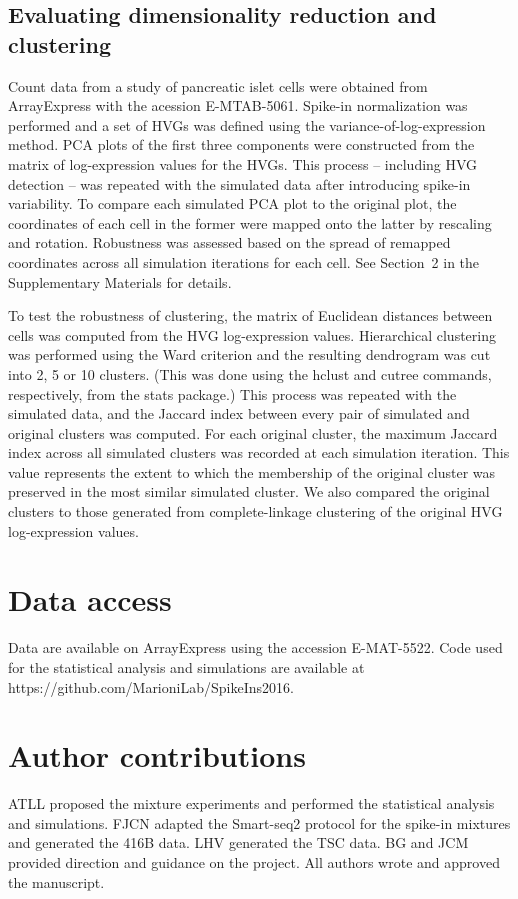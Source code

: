 \documentclass{article}
\newcommand{\suppsecsim}{2}
\begin{document}
\subsection{Evaluating dimensionality reduction and clustering}
Count data from a study of pancreatic islet cells \cite{segerstople2016single} were obtained from ArrayExpress with the acession E-MTAB-5061.
Spike-in normalization was performed and a set of HVGs was defined using the variance-of-log-expression method.
PCA plots of the first three components were constructed from the matrix of log-expression values for the HVGs.
This process -- including HVG detection -- was repeated with the simulated data after introducing spike-in variability.
To compare each simulated PCA plot to the original plot, the coordinates of each cell in the former were mapped onto the latter by rescaling and rotation.
Robustness was assessed based on the spread of remapped coordinates across all simulation iterations for each cell.
See Section~\suppsecsim{} in the Supplementary Materials for details.

To test the robustness of clustering, the matrix of Euclidean distances between cells was computed from the HVG log-expression values. 
Hierarchical clustering was performed using the Ward criterion and the resulting dendrogram was cut into 2, 5 or 10 clusters.
(This was done using the hclust and cutree commands, respectively, from the stats package.)
This process was repeated with the simulated data, and the Jaccard index between every pair of simulated and original clusters was computed.
For each original cluster, the maximum Jaccard index across all simulated clusters was recorded at each simulation iteration.
This value represents the extent to which the membership of the original cluster was preserved in the most similar simulated cluster.
We also compared the original clusters to those generated from complete-linkage clustering of the original HVG log-expression values.

\section{Data access}
Data are available on ArrayExpress using the accession E-MAT-5522.
Code used for the statistical analysis and simulations are available at https://github.com/MarioniLab/SpikeIns2016.

\section{Author contributions}
ATLL proposed the mixture experiments and performed the statistical analysis and simulations.
FJCN adapted the Smart-seq2 protocol for the spike-in mixtures and generated the 416B data.
LHV generated the TSC data.
BG and JCM provided direction and guidance on the project.
All authors wrote and approved the manuscript.
\end{document}
